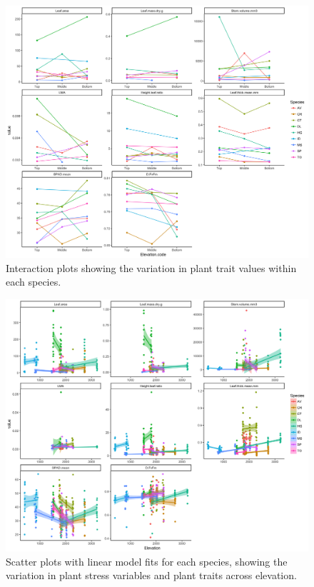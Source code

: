 \documentclass[a4paper,11pt]{article}
\begin{document}
\begin{figure}[H]
\includegraphics[width=\textwidth]{interac_trait_elev_ggplot}
\centering
\caption{Interaction plots showing the variation in plant trait values within each species.}
\label{fig:interac_trait_elev_ggplot}
\end{figure}


\begin{figure}[H]
\includegraphics[width=\textwidth]{trait_elev_lm_scatter_ggplot}
\centering
\caption{Scatter plots with linear model fits for each species, showing the variation in plant stress variables and plant traits across elevation.}
\label{fig:trait_elev_lm_scatter_ggplot}
\end{figure}
\end{document}
